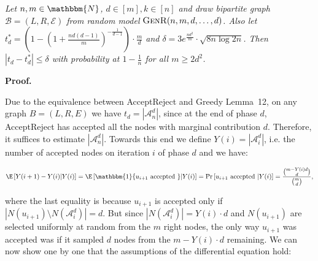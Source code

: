 \documentclass[10pt,a4paper]{article}
\begin{document}
\emph{Let $n,m\in\mathbbm{N}$, $d\in[m],k\in[n]$ and draw bipartite graph $\mathcal{B}=(L,R,\mathcal{E})$ from random model $\textsc{GenR}(n,m,d,\dots,d)$.
Also let $t^{*}_{d}=\left(1-\left(1+\frac{nd(d-1)}{m}\right)^{-\frac{1}{d-1}}\right)\cdot\frac{m}{d}$ and $\delta=3e^{\frac{nd^{2}}{m}}\cdot\sqrt{8n\log{2n}}$.
Then $|t_{d}-t^{*}_{d}|\leq\delta$ with probability at $1-\frac{1}{n}$ for all $m\geq 2d^{2}$.}\par






\par\medskip\noindent\textbf{Proof.}\par



Due to the equivalence between AcceptReject and Greedy Lemma 12, on any graph $B=(L,R,E)$ we have $t_{d}=|\mathcal{A}^{d}_{n}|$, since at the end of phase $d$, AcceptReject has accepted all the nodes with marginal contribution $d$. Therefore, it suffices to estimate $|\mathcal{A}^{d}_{n}|$. Towards this end we define $Y(i)=|\mathcal{A}^{d}_{i}|$, i.e. the number of accepted nodes on iteration $i$ of phase $d$ and we have:\par


\[\begin{gathered}
\displaystyle\E\left[Y(i+1)-Y(i)\middle|Y(i)\right]=\E\left[\mathbbm{1}\{u_{i+1}\text{ accepted }\}\middle|Y(i)\right]=\Pr\left[u_{i+1}\text{ accepted }\middle|Y(i)\right]=\frac{\binom{m-Y(i)d}{d}}{\binom{m}{d}},
\end{gathered}\]


where the last equality is because $u_{i+1}$ is accepted only if $|N(u_{i+1})\setminus N(\mathcal{A}^{d}_{i})|=d$. But since $|N(\mathcal{A}^{d}_{i})|=Y(i)\cdot d$ and $N(u_{i+1})$ are selected uniformly at random from the $m$ right nodes, the only way $u_{i+1}$ was accepted was if it sampled $d$ nodes from the $m-Y(i)\cdot d$ remaining.
We can now show one by one that the assumptions of the differential equation hold:\par
\end{document}
